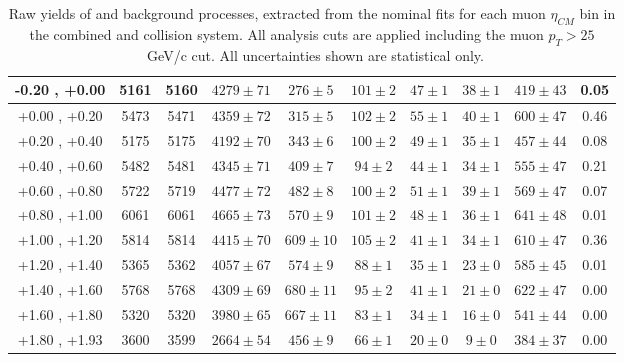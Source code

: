 \begin{table}[h!]
{\begin{tabular}{|c|*9c|}
    \hline
    -0.20 , +0.00 & 5161 & 5160 & $4279 \pm 71$ & $276 \pm 5$ & $101 \pm 2$ & $47 \pm 1$ & $38 \pm 1$ & $419 \pm 43$ & 0.05\\
    \hline
    +0.00 , +0.20 & 5473 & 5471 & $4359 \pm 72$ & $315 \pm 5$ & $102 \pm 2$ & $55 \pm 1$ & $40 \pm 1$ & $600 \pm 47$ & 0.46\\
    \hline
    +0.20 , +0.40 & 5175 & 5175 & $4192 \pm 70$ & $343 \pm 6$ & $100 \pm 2$ & $49 \pm 1$ & $35 \pm 1$ & $457 \pm 44$ & 0.08\\
    \hline
    +0.40 , +0.60 & 5482 & 5481 & $4345 \pm 71$ & $409 \pm 7$ & $94 \pm 2$ & $44 \pm 1$ & $34 \pm 1$ & $555 \pm 47$ & 0.21\\
    \hline
    +0.60 , +0.80 & 5722 & 5719 & $4477 \pm 72$ & $482 \pm 8$ & $100 \pm 2$ & $51 \pm 1$ & $39 \pm 1$ & $569 \pm 47$ & 0.07\\
    \hline
    +0.80 , +1.00 & 6061 & 6061 & $4665 \pm 73$ & $570 \pm 9$ & $101 \pm 2$ & $48 \pm 1$ & $36 \pm 1$ & $641 \pm 48$ & 0.01\\
    \hline
    +1.00 , +1.20 & 5814 & 5814 & $4415 \pm 70$ & $609 \pm 10$ & $105 \pm 2$ & $41 \pm 1$ & $34 \pm 1$ & $610 \pm 47$ & 0.36\\
    \hline
    +1.20 , +1.40 & 5365 & 5362 & $4057 \pm 67$ & $574 \pm 9$ & $88 \pm 1$ & $35 \pm 1$ & $23 \pm 0$ & $585 \pm 45$ & 0.01\\
    \hline
    +1.40 , +1.60 & 5768 & 5768 & $4309 \pm 69$ & $680 \pm 11$ & $95 \pm 2$ & $41 \pm 1$ & $21 \pm 0$ & $622 \pm 47$ & 0.00\\
    \hline
    +1.60 , +1.80 & 5320 & 5320 & $3980 \pm 65$ & $667 \pm 11$ & $83 \pm 1$ & $34 \pm 1$ & $16 \pm 0$ & $541 \pm 44$ & 0.00\\
    \hline
    +1.80 , +1.93 & 3600 & 3599 & $2664 \pm 54$ & $456 \pm 9$ & $66 \pm 1$ & $20 \pm 0$ & $9 \pm 0$ & $384 \pm 37$ & 0.00\\
    \hline
  \end{tabular}
  }
  \caption{Raw yields of \WToMuNuPl and background processes, extracted from the nominal fits for each muon $\eta_{CM}$ bin in the combined \pPb and \Pbp collision system. All analysis cuts are applied including the muon $p_{T} > 25$~GeV/c cut. All uncertainties shown are statistical only.}
  \label{tab:RawYields_WToMuPl_PA}
\end{table}


